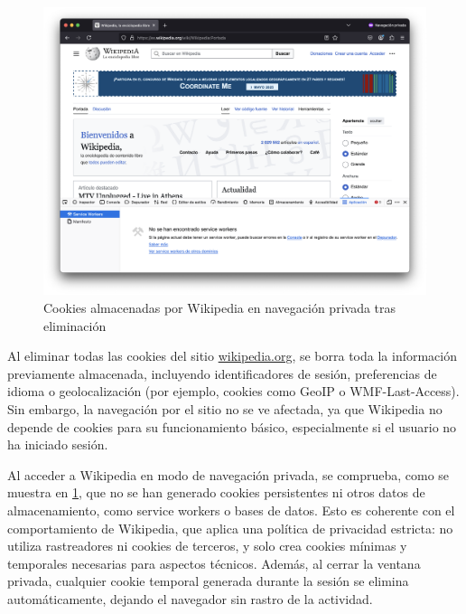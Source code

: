 \begin{figure}[H]   
    \centering
    \includegraphics[width=\textwidth]{cookies_wiki_npriv.png}
    \caption{Cookies almacenadas por Wikipedia en navegación privada tras eliminación}
    \label{fig:cookies_wiki_npriv}
\end{figure}

Al eliminar todas las cookies del sitio \url{wikipedia.org}, se borra toda la información previamente almacenada, incluyendo identificadores de sesión, preferencias de idioma o geolocalización (por ejemplo, cookies como GeoIP o WMF-Last-Access). Sin embargo, la navegación por el sitio no se ve afectada, ya que Wikipedia no depende de cookies para su funcionamiento básico, especialmente si el usuario no ha iniciado sesión. 

Al acceder a Wikipedia en modo de navegación privada, se comprueba, como se muestra en \ref{fig:cookies_wiki_npriv}, que no se han generado cookies persistentes ni otros datos de almacenamiento, como service workers o bases de datos. Esto es coherente con el comportamiento de Wikipedia, que aplica una política de privacidad estricta: no utiliza rastreadores ni cookies de terceros, y solo crea cookies mínimas y temporales necesarias para aspectos técnicos. Además, al cerrar la ventana privada, cualquier cookie temporal generada durante la sesión se elimina automáticamente, dejando el navegador sin rastro de la actividad.

